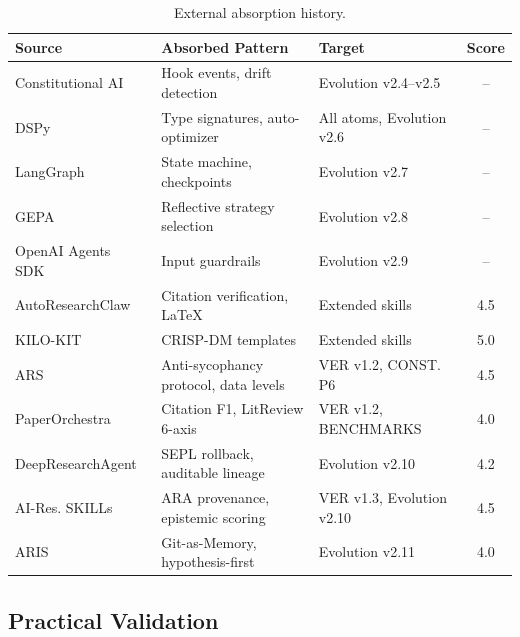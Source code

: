 \documentclass[review]{elsarticle}
\begin{document}
\begin{table}[h]\centering\caption{External absorption history.}\label{tab:absorption}
\footnotesize
\begin{tabular}{l>{\raggedright\arraybackslash}p{3.2cm}>{\raggedright\arraybackslash}p{3.5cm}c}\toprule
\textbf{Source} & \textbf{Absorbed Pattern} & \textbf{Target} & \textbf{Score}\\\midrule
Constitutional AI~\cite{bai2022constitutional} & Hook events, drift detection & Evolution v2.4--v2.5 & --\\
DSPy~\cite{khattab2023dspy} & Type signatures, auto-optimizer & All atoms, Evolution v2.6 & --\\
LangGraph~\cite{langchain2024langgraph} & State machine, checkpoints & Evolution v2.7 & --\\
GEPA~\cite{gepa2025gepa} & Reflective strategy selection & Evolution v2.8 & --\\
OpenAI Agents SDK~\cite{openai2025agents} & Input guardrails & Evolution v2.9 & --\\
AutoResearchClaw~\cite{aiming2025claw} & Citation verification, LaTeX & Extended skills & 4.5\\
KILO-KIT~\cite{vo2025kilo} & CRISP-DM templates & Extended skills & 5.0\\
ARS~\cite{ars2025academic} & Anti-sycophancy protocol, data levels & VER v1.2, CONST. P6 & 4.5\\
PaperOrchestra~\cite{song2026paperorchestra} & Citation F1, LitReview 6-axis & VER v1.2, BENCHMARKS & 4.0\\
DeepResearchAgent~\cite{skyworkai2026deep} & SEPL rollback, auditable lineage & Evolution v2.10 & 4.2\\
AI-Res. SKILLs~\cite{orchestra2026airesearch} & ARA provenance, epistemic scoring & VER v1.3, Evolution v2.10 & 4.5\\
ARIS~\cite{yang2026aris} & Git-as-Memory, hypothesis-first & Evolution v2.11 & 4.0\\\bottomrule
\end{tabular}\end{table}

\subsection{Practical Validation}
\end{document}
